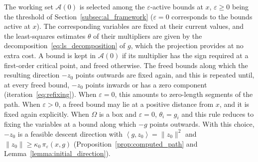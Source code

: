 \documentclass[pdflatex,sn-mathphys-num]{sn-jnl}%
\theoremstyle{thmstyleone}%
\newcommand{\calA}{{\mathcal{A}}}
\newcommand{\inner}[2]{\left\langle {#1} , {#2} \right\rangle} %
\begin{document}
\begin{appendices}
The working set $\calA(0)$ is selected among the $\varepsilon$-active bounds at $x$, $\varepsilon \ge 0$ being the threshold of Section~\ref{subsec:al_framework} ($\varepsilon = 0$ corresponds to the bounds active at $x$). The corresponding variables are fixed at their current values, and the least-squares estimates $\theta$ of their multipliers are given by the decomposition~\eqref{eq:ls_decomposition} of $g$, which the projection provides at no extra cost. A bound is kept in $\calA(0)$ if its multiplier has the sign required at a first-order critical point, and freed otherwise. The freed bounds along which the resulting direction $-z_0$ points outwards are fixed again, and this is repeated until, at every freed bound, $-z_0$ points inwards or has a zero component (iteration~\eqref{eq:refixing}). When $\varepsilon = 0$, this amounts to zero-length segments of the path. When $\varepsilon > 0$, a freed bound may lie at a positive distance from $x$, and it is fixed again explicitly. When $\Omega$ is a box and $\varepsilon = 0$, $\theta_i = g_i$ and this rule reduces to fixing the variables at a bound along which $-g$ points outwards. With this choice, $-z_0$ is a feasible descent direction with $\inner{g}{z_0} = \|z_0\|^2$ and $\|z_0\| \ge \kappa_0\,\pi_\varepsilon(x,g)$ (Proposition~\ref{prop:computed_path} and Lemma~\ref{lemma:initial_direction}).


\end{appendices}
\end{document}
